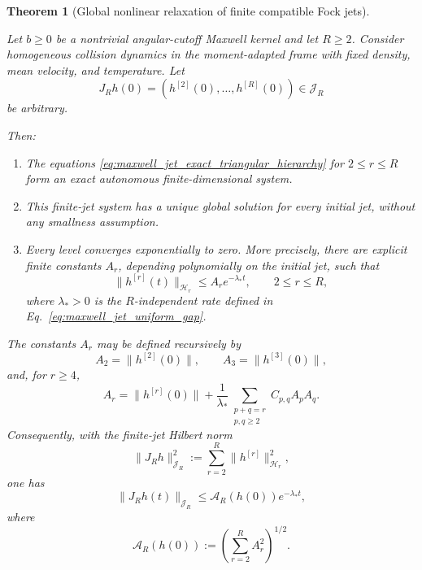 \documentclass[11pt,oneside]{article}
\numberwithin{equation}{section}
\newtheorem{theorem}{Theorem}[section]
\theoremstyle{definition}
\begin{document}
\begin{theorem}[Global nonlinear relaxation of finite compatible Fock jets]
\label{thm:maxwell_finite_jet_relaxation}

Let $b\geq0$ be a nontrivial angular-cutoff Maxwell kernel and let
$R\geq2$.  Consider homogeneous collision dynamics in the moment-adapted
frame with fixed density, mean velocity, and temperature.  Let
\begin{equation}
J_Rh(0)
=
\left(
h^{[2]}(0),\ldots,h^{[R]}(0)
\right)
\in\mathscr J_R
\end{equation}
be arbitrary.

Then:

\begin{enumerate}
\item
The equations
\eqref{eq:maxwell_jet_exact_triangular_hierarchy} for
$2\leq r\leq R$ form an exact autonomous finite-dimensional system.

\item
This finite-jet system has a unique global solution for every initial
jet, without any smallness assumption.

\item
Every level converges exponentially to zero.  More precisely, there are
explicit finite constants $A_r$, depending polynomially on the initial
jet, such that
\begin{equation}
\|h^{[r]}(t)\|_{\mathscr H_r}
\leq
A_r e^{-\lambda_*t},
\qquad
2\leq r\leq R,
\label{eq:maxwell_jet_shell_decay}
\end{equation}
where $\lambda_*>0$ is the $R$-independent rate defined in
Eq.~\eqref{eq:maxwell_jet_uniform_gap}.
\end{enumerate}

The constants $A_r$ may be defined recursively by
\begin{equation}
A_2
=
\|h^{[2]}(0)\|,
\qquad
A_3
=
\|h^{[3]}(0)\|,
\label{eq:maxwell_jet_A23}
\end{equation}
and, for $r\geq4$,
\begin{equation}
A_r
=
\|h^{[r]}(0)\|
+
\frac{1}{\lambda_*}
\sum_{\substack{p+q=r\\p,q\geq2}}
C_{p,q}A_pA_q.
\label{eq:maxwell_jet_Ar_recursion}
\end{equation}
Consequently, with the finite-jet Hilbert norm
\begin{equation}
\|J_Rh\|_{\mathscr J_R}^2
:=
\sum_{r=2}^{R}
\|h^{[r]}\|_{\mathscr H_r}^2,
\label{eq:maxwell_jet_norm}
\end{equation}
one has
\begin{equation}
\boxed{
\|J_Rh(t)\|_{\mathscr J_R}
\leq
\mathcal A_R(h(0))
e^{-\lambda_*t},
}
\label{eq:maxwell_jet_global_decay}
\end{equation}
where
\begin{equation}
\mathcal A_R(h(0))
:=
\left(
\sum_{r=2}^{R}A_r^2
\right)^{1/2}.
\label{eq:maxwell_jet_AR_def}
\end{equation}
\end{theorem}
\end{document}
